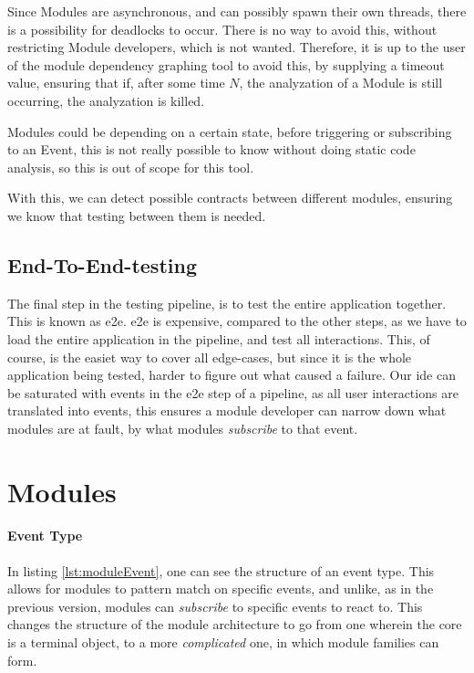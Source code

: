 Since Modules are asynchronous, and can possibly spawn their own threads, there
is a possibility for deadlocks to occur. There is no way to avoid this, without
restricting Module developers, which is not wanted. Therefore, it is up to
the user of the module dependency graphing tool to avoid this, by supplying a
timeout value, ensuring that if, after some time $N$, the analyzation of a
Module is still occurring, the analyzation is killed.

Modules could be depending on a certain state, before triggering or
subscribing to an Event, this is not really possible to know without doing
static code analysis, so this is out of scope for this tool.

With this, we can detect possible contracts between different modules, ensuring
we know that testing between them is needed.

\subsection{End-To-End-testing}

The final step in the testing pipeline, is to test the entire application
together. This is known as \gls*{e2e}. \gls*{e2e} is expensive, compared to the
other steps, as we have to load the entire application in the pipeline, and test
all interactions. This, of course, is the easiet way to cover all edge-cases, but
since it is the whole application being tested, harder to figure out what caused
a failure. Our \gls*{ide} can be saturated with events in the \gls*{e2e} step of a
pipeline, as all user interactions are translated into events, this ensures a
module developer can narrow down what modules are at fault, by what modules
\textit{subscribe} to that event.

\section{Modules} \label{sec:modules}

\paragraph{Event Type} In listing \ref{lst:moduleEvent}, one can see the
structure of an event type. This allows for modules to pattern match on specific
events, and unlike, as in the previous version, modules can \textit{subscribe}
to specific events to react to. This changes the structure of the module
architecture to go from one wherein the core is a terminal object, to a more
\textit{complicated} one, in which module families can form.

